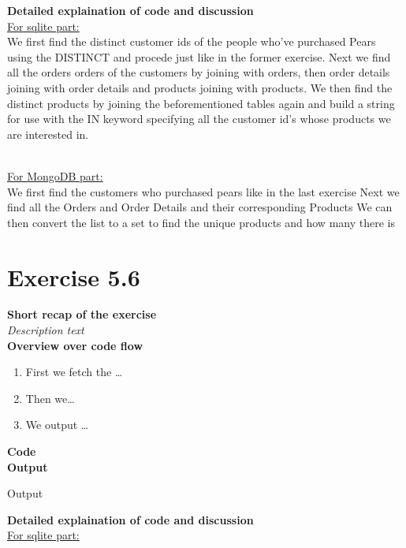 \documentclass{article}
\newcommand\pythonstyle{\lstset{
language=python,
breaklines=true,
basicstyle=\ttfamily\small,
otherkeywords={1, 2, 3, 4, 5, 6, 7, 8 ,9 , 0, -, =, +, [, ], (, ), \{, \}, :, *, !},             %
keywordstyle=\color{blue},
emph={class, pass, in, for, while, if, is, elif, else, not, and, or, OR
    def, print, exec, break, continue, return},
emphstyle=\color{black}\bfseries,
emph={[2]True, False, None, self},
emphstyle=[2]\color{purple},
emph={[3]from, import, as},
emphstyle=[3]\color{blue},
stringstyle=\color{red},
frame=tb,
showstringspaces=false,
morecomment=[s]{"""}{"""},
commentstyle=\color{gray},
rulesepcolor=\color{blue},
title=\lstname
}}
\newcommand\pythonexternal[2][]{{
\pythonstyle
}}
\begin{document}
\textbf{Detailed explaination of code and discussion}\\
\underline{For sqlite part:}~\\
We first find the distinct customer ids of the people who've purchased Pears using the DISTINCT and procede just like in the former exercise.
Next we find all the orders orders of the customers by joining with orders, then order details joining with order details and products joining with products.
We then find the distinct products by joining the beforementioned tables again and
build a string for use with the IN keyword specifying all the customer id's whose products we are interested in.

~\\
\underline{For MongoDB part:}~\\
We first find the customers who purchased pears like in the last exercise
Next we find all the Orders and Order Details and their corresponding Products
We can then convert the list to a set to find the unique products and how many there is






\section{Exercise 5.6}
\textbf{Short recap of the exercise}\\
\textit{Description text}\\

\textbf{Overview over code flow}\\

\begin{enumerate}
  \item First we fetch the \ldots
  \item Then we\ldots
  \item We output \ldots\\
\end{enumerate}

\textbf{Code}\\
\textbf{Output}
\begin{pythonOutput}
Output
\end{pythonOutput}
\textbf{Detailed explaination of code and discussion}\\
\underline{For sqlite part:}~\\
\end{document}
